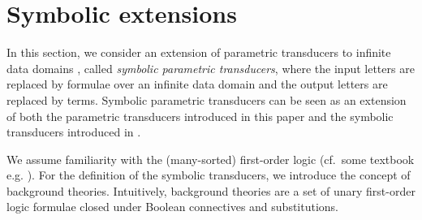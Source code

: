 
\section{Symbolic extensions}
\label{sec:symbolic}


In this section, we consider an extension of parametric transducers to infinite data domains , called \emph{symbolic parametric transducers}, where the input letters are replaced by formulae over an infinite data domain and the output letters are replaced by terms. 
%
Symbolic parametric transducers can be seen as an extension of both the parametric transducers introduced in this paper and the symbolic transducers introduced in \cite{VHLMB12}.

We assume familiarity with the (many-sorted) first-order logic (cf.\ some textbook e.g. \cite{EFT94}).
For the definition of the symbolic transducers, we introduce the concept of background theories.
 Intuitively, background theories are a set of unary first-order logic formulae closed under Boolean connectives and substitutions. 

